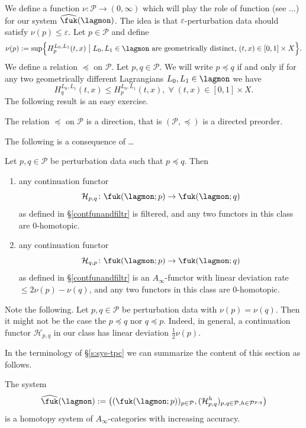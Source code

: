 We define a function $\nu\colon \mathcal{P}\to (0,\infty)$ which will play the role of  function (see ...) for our system $\widehat{\fuk}(\lagmon)$. The idea is that $\varepsilon$-perturbation data should satisfy $\nu(p)\leq \varepsilon$. Let $p\in \mathcal{P}$ and define \begin{equation} \label{eq:nu-fuk}
  \nu(p) := \sup \Bigl\{H_p^{L_0, L_1}(t,x) \bigm| L_0, L_1 \in \lagmon
  \text{\ are geometrically distinct, }
  (t,x) \in [0,1]\times X\Bigr\}.
\end{equation}
We define a relation $\preceq$ on $\mathcal{P}$. Let $p,q\in \mathcal{P}$. We will write $p\preceq q$ if and only if for any two geometrically different Lagrangians $L_0,L_1\in \lagmon$ we have 
$$H_q^{L_0, L_1}(t,x) \leq H_p^{L_0, L_1}(t,x), \; \forall \; (t,x) \in
[0,1] \times X.$$
The following result is an easy exercise.
\begin{lem}\label{direction}
The relation $\preceq$ on $\mathcal{P}$ is a direction, that is $(\mathcal{P},\preceq)$ is a directed preorder.
\end{lem}
The following is a consequence of \dots
\begin{lem}\label{syscf}
  Let $p,q\in \mathcal{P}$ be perturbation data such that $p\preceq q$. Then 
  \begin{enumerate}
  \item any continuation functor $$\mathcal{H}_{p,q}\colon \fuk(\lagmon;p)\to \fuk(\lagmon ;q)$$ as defined in \S\ref{contfunandfiltr} is filtered, and any two functors in this class are $0$-homotopic.
  \item any continuation functor $$\mathcal{H}_{q,p}\colon \fuk(\lagmon;p)\to \fuk(\lagmon;q)$$ as defined in \S\ref{contfunandfiltr} is an $A_\infty$-functor with linear deviation rate $\leq 2\nu(p)-\nu(q)$, and any two functors in this class are $0$-homotopic.
  \end{enumerate}
\end{lem}
\begin{remark}
  Note the following. Let $p,q\in \mathcal{P}$ be perturbation data with $\nu(p)=\nu(q)$. Then it might not be the case the $p\preceq q$ nor $q\preceq p$. Indeed, in general, a continuation functor $\mathcal{H}_{p,q}$ in our class has linear deviation $\frac{1}{2}\nu(p)$.
\end{remark}
In the terminology of \S\ref{s:sys-tpc} we can summarize the content of this section as follows.
\begin{cor}\label{ffc1}
  The system $$\widehat{\fuk}(\lagmon):= \left((\fuk(\lagmon;p))_{p\in \mathcal{P}}, (\mathcal{H}^h_{p,q})_{p,q\in \mathcal{P}, h\in \mathcal{P}^{p,q}}\right)$$ is a homotopy system of $A_\infty$-categories with increasing accuracy.
\end{cor}
